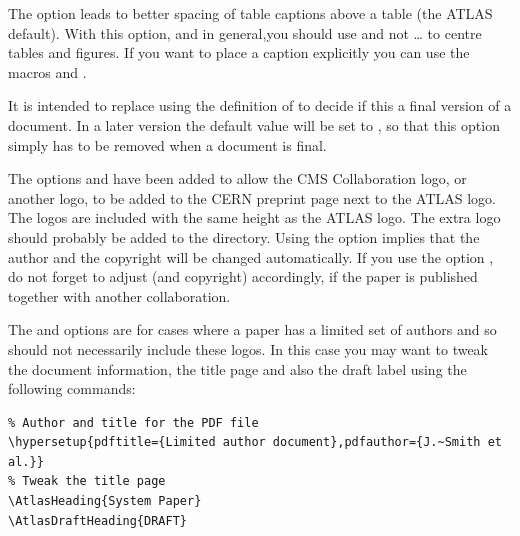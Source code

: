  The option  leads to better spacing of table captions above a table (the ATLAS default).
With this option, and in general,you should use 
and not \ldots{} to centre tables and figures.
If you want to place a caption explicitly you can use
the macros  and .

 It is intended to replace using the definition of  to decide if this a final version of a document.
In a later version the default value will be set to ,
so that this option simply has to be removed when a document is final.

 The options  and  have been added to allow
the CMS Collaboration logo, or another logo, to be added to the CERN preprint page next to the ATLAS logo.
The logos are included with the same height as the ATLAS logo.
The extra logo should probably be added to the  directory.
Using the option  implies that the author and the copyright will be changed automatically.
If you use the option , do not forget to adjust  (and copyright) accordingly,
if the paper is published together with another collaboration.

The  and  options are for cases where a paper has a limited set of authors
and so should not necessarily include these logos.
In this case you may want to tweak the  document information,
the title page and also the draft label using the following commands:
\begin{verbatim}
% Author and title for the PDF file
\hypersetup{pdftitle={Limited author document},pdfauthor={J.~Smith et al.}}
% Tweak the title page
\AtlasHeading{System Paper}
\AtlasDraftHeading{DRAFT}
\end{verbatim}

